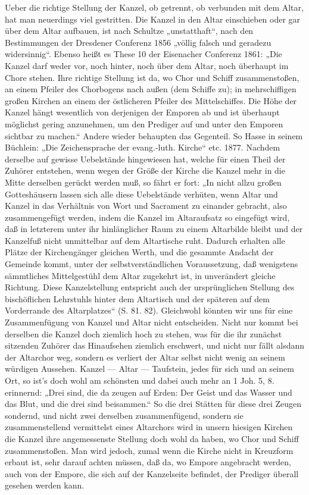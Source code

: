 Ueber die richtige Stellung der Kanzel, ob getrennt, ob verbunden mit dem Altar, hat man neuerdings viel gestritten. Die Kanzel in den Altar einschieben oder gar über dem Altar aufbauen, ist nach Schultze „unstatthaft“, nach den Bestimmungen der Dresdener Conferenz 1856 „völlig falsch und geradezu widersinnig“. Ebenso heißt es These 10 der Eisenacher Conferenz 1861: „Die Kanzel darf weder vor, noch hinter, noch über dem Altar, noch überhaupt im Chore stehen. Ihre richtige Stellung ist da, wo Chor und Schiff zusammenstoßen, an einem Pfeiler des Chorbogens nach außen (dem Schiffe zu); in mehrschiffigen großen Kirchen an einem der östlicheren Pfeiler des Mittelschiffes. Die Höhe der Kanzel hängt wesentlich von derjenigen der Emporen ab und ist überhaupt möglichst gering anzunehmen, um den Prediger auf und unter den Emporen sichtbar zu machen.“ Andere wieder behaupten das Gegenteil. So Hasse in seinem Büchlein: „Die Zeichensprache der evang.-luth. Kirche“ etc. 1877. Nachdem derselbe auf gewisse Uebelstände hingewiesen hat, welche für einen Theil der Zuhörer entstehen, wenn wegen der Größe der Kirche die Kanzel mehr in die Mitte derselben gerückt werden muß, so fährt er fort: „In nicht allzu großen Gotteshäusern lassen sich alle diese Uebelstände verhüten, wenn Altar und Kanzel in das Verhältnis von Wort und Sacrament zu einander gebracht, also zusammengefügt werden, indem die Kanzel im Altaraufsatz so eingefügt wird, daß in letzterem unter ihr hinlänglicher Raum zu einem Altarbilde bleibt und der Kanzelfuß nicht unmittelbar auf dem Altartische ruht. Dadurch erhalten alle Plätze der Kirchengänger gleichen Werth, und die gesammte Andacht der Gemeinde kommt, unter der selbstverständlichen Voraussetzung, daß wenigstens sämmtliches Mittelgestühl dem Altar zugekehrt ist, in unverändert gleiche Richtung. Diese Kanzelstellung entspricht auch der ursprünglichen Stellung des bischöflichen Lehrstuhls hinter dem Altartisch und der späteren auf dem Vorderrande des Altarplatzes“ (S. 81. 82). Gleichwohl
könnten wir uns für eine Zusammenfügung von Kanzel und Altar nicht entscheiden. Nicht nur kommt bei derselben die Kanzel doch ziemlich hoch zu stehen, was für die ihr zunächst sitzenden Zuhörer das Hinaufsehen ziemlich erschwert, und nicht nur fällt alsdann der Altarchor weg, sondern es verliert der Altar selbst nicht wenig an seinem würdigen Aussehen. Kanzel — Altar — Taufstein, jedes für sich und an seinem Ort, so ist’s doch wohl am schönsten und dabei auch mehr an 1 Joh. 5, 8. erinnernd: „Drei sind, die da zeugen auf Erden: Der Geist und das Wasser und das Blut, und die drei sind beisammen.“ So die drei Stätten für diese drei Zeugen sondernd, und nicht zwei derselben zusammenfügend, sondern sie zusammenstellend vermittelst eines Altarchors wird in unsern hiesigen Kirchen die Kanzel ihre angemessenste Stellung doch wohl da haben, wo Chor und Schiff zusammenstoßen. Man wird jedoch, zumal wenn die Kirche nicht in Kreuzform erbaut ist, sehr darauf achten müssen, daß da, wo Empore angebracht werden, auch von der Empore, die sich auf der Kanzelseite befindet, der Prediger überall gesehen werden kann.

